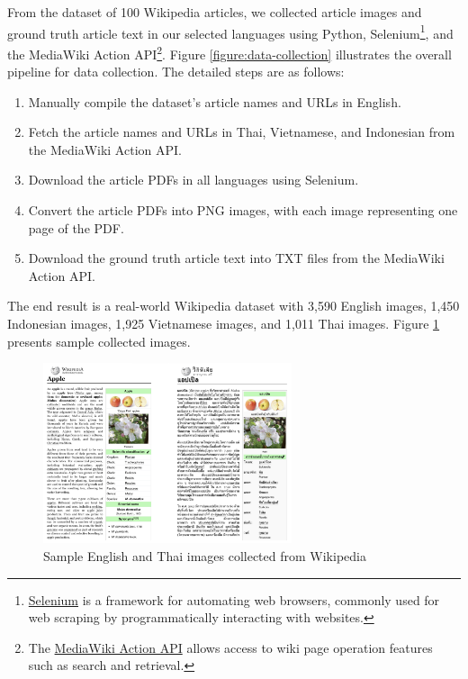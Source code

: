 \documentclass[12pt,oneside]{memoir}
\begin{document}
From the dataset of 100 Wikipedia articles, we collected article images and ground 
truth article text in our selected languages using Python, 
Selenium\footnote{\href{https://selenium-python.readthedocs.io}{Selenium} is a 
framework for automating web browsers, commonly used for web scraping by programmatically 
interacting with websites.}, and the MediaWiki Action API\footnote{The \href{https://www.mediawiki.org/wiki/API:Main_page}{MediaWiki Action API} allows 
access to wiki page operation features such as search and retrieval.}. Figure \ref{figure:data-collection} illustrates the overall pipeline 
for data collection. The detailed steps are as follows:

\begin{enumerate}
    \item Manually compile the dataset’s article names and URLs in English.
    \item Fetch the article names and URLs in Thai, Vietnamese, and Indonesian from the MediaWiki Action API.
    \item Download the article PDFs in all languages using Selenium.
    \item Convert the article PDFs into PNG images, with each image representing one page of the PDF.
    \item Download the ground truth article text into TXT files from the MediaWiki Action API.
\end{enumerate}

The end result is a real-world Wikipedia dataset with 3,590 English images, 1,450 Indonesian images, 1,925 Vietnamese images, and 1,011 Thai images.
Figure \ref{figure:real-world-data} presents sample collected images.

\begin{figure}[ht]
    \centering
    \includegraphics[width=0.65\textwidth]{images/real-world-data.png}
    \caption{Sample English and Thai images collected from Wikipedia}
    \label{figure:real-world-data}
\end{figure}
\end{document}
